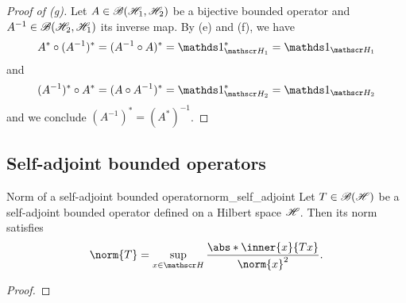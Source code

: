 \begin{proof}[Proof of (g)]
    Let \(A \in \mathscr{B}(\mathscr{H}_1, \mathscr{H}_2)\) be a bijective bounded operator and \(A^{-1} \in \mathscr{B}(\mathscr{H}_2, \mathscr{H}_1)\) its inverse map. By (e) and (f), we have
    \begin{equation*}
        A^* \circ (A^{-1})^* = (A^{-1} \circ A)^* = \unity_{\hilbert_1}^* = \unity_{\hilbert_1}
    \end{equation*}
    and
    \begin{equation*}
        (A^{-1})^* \circ A^* = (A \circ A^{-1})^* = \unity_{\hilbert_2}^* = \unity_{\hilbert_2}
    \end{equation*}
    and we conclude \((A^{-1})^* = (A^*)^{-1}\).
\end{proof}
\todo

\subsection{Self-adjoint bounded operators}
\todo
\begin{theorem}{Norm of a self-adjoint bounded operator}{norm_self_adjoint}
    Let \(T \in \mathscr{B}(\mathscr{H})\) be a self-adjoint bounded operator defined on a Hilbert space \(\mathscr{H}\). Then its norm satisfies
    \begin{equation*}
        \norm{T} = \sup_{x \in \hilbert}\frac{\abs*{\inner{x}{Tx}}}{\norm{x}^2}.
    \end{equation*}
\end{theorem}
\begin{proof}
    \todo
\end{proof}

